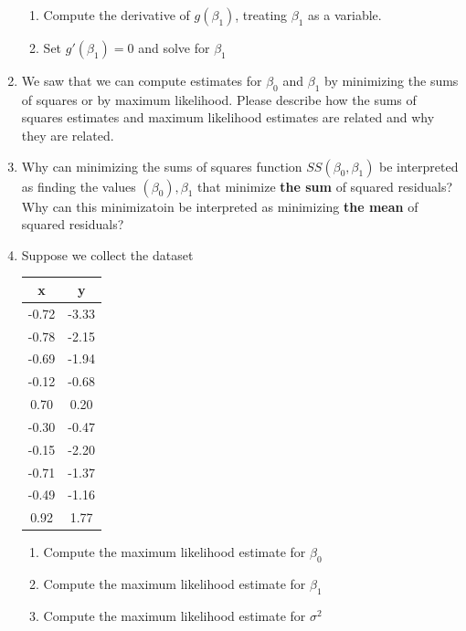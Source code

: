\begin{enumerate}
\begin{enumerate}
        \item Compute the derivative of $g(\beta_{1})$, treating $\beta_{1}$ as a variable.
        
        \item Set $g'(\beta_{1}) = 0$ and solve for $\beta_{1}$ 
        
    \end{enumerate}
    
    \item We saw that we can compute estimates for $\beta_{0}$ and $\beta_{1}$ by minimizing the sums of squares or by maximum likelihood. 
    Please describe how the sums of squares estimates and maximum likelihood estimates are related and why they are related.
    
    \item Why can minimizing the sums of squares function $SS(\beta_{0}, \beta_{1})$ be interpreted as finding the values $(\beta_{0}), \beta_{1}$ that minimize \textbf{the sum} of squared residuals? Why can this minimizatoin be interpreted as minimizing \textbf{the mean} of squared residuals?
    
    \item Suppose we collect the dataset
    \begin{table}[ht!]
        \centering
        \begin{tabular}{c|c}
            x & y \\
            \hline
            -0.72 &  -3.33\\
            -0.78 &  -2.15\\
            -0.69 &  -1.94\\
            -0.12 &  -0.68\\
             0.70 &  0.20\\
            -0.30 &  -0.47\\
            -0.15 &  -2.20\\
            -0.71 &  -1.37\\
            -0.49 &  -1.16\\
             0.92 &  1.77\\
        \end{tabular}
    \end{table}
    \begin{enumerate}
        \item Compute the maximum likelihood estimate for $\beta_{0}$
        \item Compute the maximum likelihood estimate for $\beta_{1}$
        \item Compute the maximum likelihood estimate for $\sigma^{2}$
    \end{enumerate}
    

\end{enumerate}
